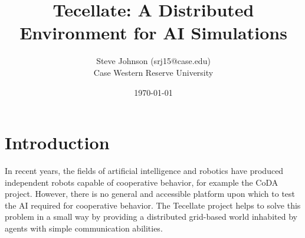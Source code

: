 \documentclass[12pt]{article}
\title{Tecellate: A Distributed Environment for AI Simulations}
\author{
        Steve Johnson (srj15@case.edu)\\
        Case Western Reserve University\\
}
\date{\today}
\begin{document}
\doublespacing
\maketitle


\section{Introduction}

In recent years, the fields of artificial intelligence and robotics have produced independent robots capable of cooperative behavior, for example the CoDA project\cite{CoDA}. However, there is no general and accessible platform upon which to test the AI required for cooperative behavior. The Tecellate project helps to solve this problem in a small way by providing a distributed grid-based world inhabited by agents with simple communication abilities.











\end{document}

